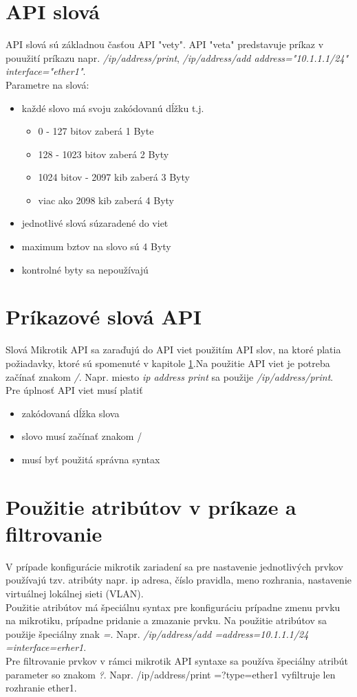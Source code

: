 \section{API slová}
\label{chap:APIwords}
API slová \cite{API} sú základnou časťou API "vety". API "veta" predstavuje príkaz v pouužití príkazu napr. \textit{\//ip/address/print}, \textit{\//ip/address/add address="10.1.1.1/24" interface="ether1"}. \\
Parametre na slová:
\begin{itemize}
\item každé slovo má svoju zakódovanú dĺžku t.j. 
\begin{itemize}
\item 0 - 127 bitov zaberá 1 Byte
\item 128 - 1023 bitov zaberá 2 Byty 
\item 1024 bitov - 2097 kib zaberá 3 Byty
\item viac ako 2098 kib zaberá 4 Byty
\end{itemize}
\item jednotlivé slová súzaradené do viet
\item maximum bztov na slovo sú 4 Byty
\item kontrolné byty sa nepoužívajú
\end{itemize}
\section{Príkazové slová API}
Slová Mikrotik API sa zaraďujú do API viet použitím API slov, na ktoré platia požiadavky, ktoré sú spomenuté v kapitole \ref{chap:APIwords}.Na použitie API viet je potreba začínať znakom \textit{\//}. Napr. miesto \textit{ip address print} sa použije \textit{\//ip/address/print}.\\
Pre úplnosť API viet musí platiť \cite{API}
\begin{itemize}
\item zakódovaná dĺžka slova
\item slovo musí začínať znakom \//
\item musí byť použitá správna syntax
\end{itemize}
\section{Použitie atribútov v príkaze a filtrovanie}
V prípade konfigurácie mikrotik zariadení sa pre nastavenie jednotlivých prvkov používajú tzv. atribúty \cite{API} napr. ip adresa, číslo pravidla, meno rozhrania, nastavenie virtuálnej lokálnej sieti (VLAN). \\
Použitie atribútov má špeciálnu syntax pre konfiguráciu prípadne zmenu prvku na mikrotiku, prípadne pridanie a zmazanie prvku. Na použitie atribútov sa použije špeciálny znak \textit{=}. Napr. \textit{\//ip/address/add =address=10.1.1.1/24 =interface=erher1}.\\
Pre filtrovanie prvkov v rámci mikrotik API syntaxe sa používa špeciálny atribút parameter so znakom \textit{?}. Napr. \//ip/address/print =?type=ether1 vyfiltruje len rozhranie ether1.
